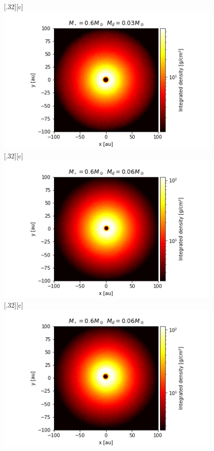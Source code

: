 \documentclass[aps,prb,twocolumn,superscriptaddress,floatfix,longbibliography]{revtex4-2}
\begin{document}
\begin{appendices}
\begin{figure}[!htbp]
  \subcaptionbox*{}[.32\linewidth][c]{%
    \includegraphics[width=\linewidth]{Graphs_2D/r_0.6s_0.03d_0.7q_2D.png}}\quad    
  \subcaptionbox*{}[.32\linewidth][c]{%
    \includegraphics[width=\linewidth]{Graphs_2D/r_0.6s_0.06d_0.3q_2D.png}}\quad
  \subcaptionbox*{}[.32\linewidth][c]{%
    \includegraphics[width=\linewidth]{Graphs_2D/r_0.6s_0.06d_0.5q_2D.png}}\quad

\end{figure}
\end{appendices}
\end{document}
